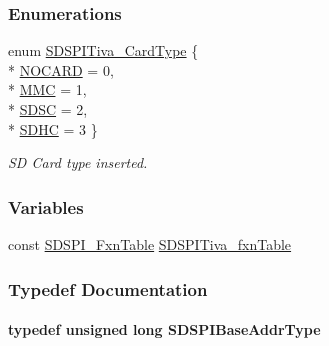 \subsubsection*{Enumerations}
\begin{DoxyCompactItemize}
\item 
enum \hyperlink{_s_d_s_p_i_tiva_8h_a735a3f0fb087ca4e97c2e43ed68b1a0a}{S\+D\+S\+P\+I\+Tiva\+\_\+\+Card\+Type} \{ \\*
\hyperlink{_s_d_s_p_i_tiva_8h_a735a3f0fb087ca4e97c2e43ed68b1a0aa422cdc20ba86c8cdcf1f0fd2318a1cfc}{N\+O\+C\+A\+R\+D} = 0, 
\\*
\hyperlink{_s_d_s_p_i_tiva_8h_a735a3f0fb087ca4e97c2e43ed68b1a0aaa7d8fca3406f36682514f0384d910fac}{M\+M\+C} = 1, 
\\*
\hyperlink{_s_d_s_p_i_tiva_8h_a735a3f0fb087ca4e97c2e43ed68b1a0aa87550a2102744c14e5e2e0ed39cc04b2}{S\+D\+S\+C} = 2, 
\\*
\hyperlink{_s_d_s_p_i_tiva_8h_a735a3f0fb087ca4e97c2e43ed68b1a0aab27db2a19a825c3e6f1513cdab7c81ea}{S\+D\+H\+C} = 3
 \}
\begin{DoxyCompactList}\small\item\em S\+D Card type inserted. \end{DoxyCompactList}\end{DoxyCompactItemize}
\subsubsection*{Variables}
\begin{DoxyCompactItemize}
\item 
const \hyperlink{struct_s_d_s_p_i___fxn_table}{S\+D\+S\+P\+I\+\_\+\+Fxn\+Table} \hyperlink{_s_d_s_p_i_tiva_8h_ad072461b84c29fa7407d809e1e525c41}{S\+D\+S\+P\+I\+Tiva\+\_\+fxn\+Table}
\end{DoxyCompactItemize}


\subsubsection{Typedef Documentation}
\paragraph[{S\+D\+S\+P\+I\+Base\+Addr\+Type}]{\setlength{\rightskip}{0pt plus 5cm}typedef unsigned long {\bf S\+D\+S\+P\+I\+Base\+Addr\+Type}}\label{_s_d_s_p_i_tiva_8h_ad2ee2f6fbdb79c0577161ae92a7f1650}
